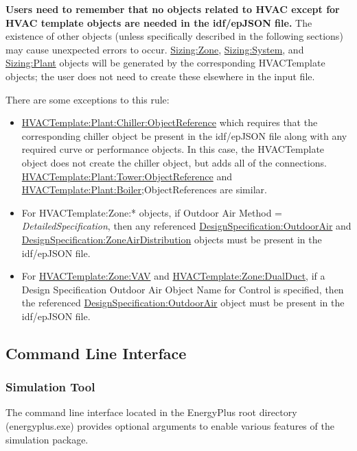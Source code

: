 \textbf{Users need to remember that no objects related to HVAC except for HVAC template objects are needed in the idf/epJSON file.} The existence of other objects (unless specifically described in the following sections) may cause unexpected errors to occur. \hyperref[sizingzone]{Sizing:Zone}, \hyperref[sizingsystem]{Sizing:System}, and \hyperref[sizingplant]{Sizing:Plant} objects will be generated by the corresponding HVACTemplate objects; the user does not need to create these elsewhere in the input file.

There are some exceptions to this rule:

\begin{itemize}
\item
  \hyperref[hvactemplateplantchillerobjectreference]{HVACTemplate:Plant:Chiller:ObjectReference} which requires that the corresponding chiller object be present in the idf/epJSON file along with any required curve or performance objects. In this case, the HVACTemplate object does not create the chiller object, but adds all of the connections. \hyperref[hvactemplateplanttowerobjectreference]{HVACTemplate:Plant:Tower:ObjectReference} and \hyperref[hvactemplateplantboiler]{HVACTemplate:Plant:Boiler};ObjectReferences are similar.
\item
  For HVACTemplate:Zone:* objects, if Outdoor Air Method = \emph{DetailedSpecification}, then any referenced \hyperref[designspecificationoutdoorair]{DesignSpecification:OutdoorAir} and \hyperref[designspecificationzoneairdistribution]{DesignSpecification:ZoneAirDistribution} objects must be present in the idf/epJSON file.
\item
  For \hyperref[hvactemplatezonevav]{HVACTemplate:Zone:VAV} and \hyperref[hvactemplatezonedualduct]{HVACTemplate:Zone:DualDuct}, if a Design Specification Outdoor Air Object Name for Control is specified, then the referenced \hyperref[designspecificationoutdoorair]{DesignSpecification:OutdoorAir} object must be present in the idf/epJSON file.
\end{itemize}

\subsection{Command Line Interface}

\subsubsection{Simulation Tool}

The command line interface located in the EnergyPlus root directory (energyplus.exe) provides optional arguments to enable various features of the simulation package.

